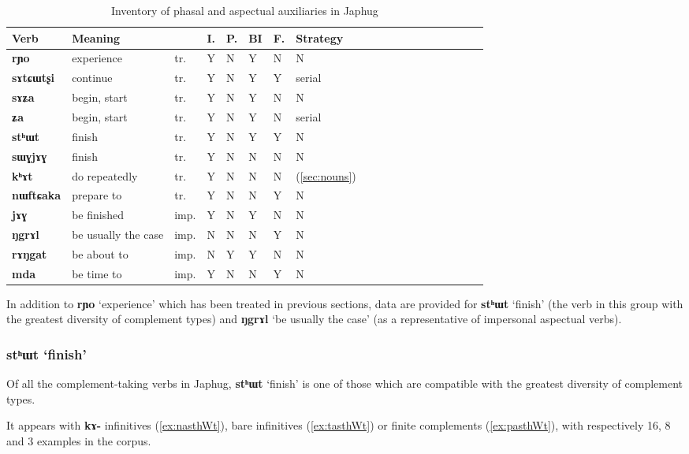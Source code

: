 \documentclass[oneside,a4paper,11pt]{article}
\newcommand{\ipa}[1]{\textbf{\phon#1}} %
\newcommand{\jpg}[2]{\ipa{#1} `#2'} %
\newcommand{\refb}[1]{(\ref{#1})}
\begin{document}
\begin{table}[H]
\caption{Inventory of phasal and aspectual auxiliaries in Japhug} \label{tab:phasal} 
\begin{tabular}{lllllllllllllllllll}
\toprule
Verb & 	Meaning & 	 & 	I. & 	P.& 	BI & 	F. & 	Strategy & 	\\
\midrule
\ipa{rɲo} & 	experience & 	tr. & 	Y & 	N & 	Y & 	N & 	N & 	\\
\ipa{sɤtɕɯtʂi} & 	continue & 	tr. & 	Y & 	N & 	Y & 	Y & 	serial & 	\\
\ipa{sɤʑa} & 	begin, start & 	tr. & 	Y & 	N & 	Y & 	N & 	N & 	\\
\ipa{ʑa} & 	begin, start & 	tr. & 	Y & 	N & 	Y & 	N & 	serial & 	\\
\ipa{stʰɯt} & 	finish & 	tr. & 	Y & 	N & 	Y & 	Y & 	N & 	\\
\ipa{sɯɣjɤɣ} & 	finish & 	tr. & 	Y & 	N & 	N & 	N & 	N & 	\\
\ipa{kʰɤt} & 	do repeatedly & 	tr. & 	Y & 	N & 	N & 	N & 	\refb{sec:nouns}& 	\\
\ipa{nɯftɕaka} & prepare to & 	tr. & 	Y & 	N & 	N & 	Y & 	N & 	\\
\midrule
\ipa{jɤɣ} & 	be finished & 	imp. & 	Y & 	N & 	Y & 	N & 	N & 	\\
\ipa{ŋgrɤl} & 	be usually the case & 	imp. & 	N & 	N & 	N & 	Y & 	N & 	\\
\ipa{rɤŋgat} & 	be about to & 	imp. & 	N & 	Y & 	Y & 	N & 	N & 	\\
\ipa{mda} & 	be time to & 	imp. & 	Y & 	N & N & 	Y & 	N & 	\\
\bottomrule
\end{tabular}
\end{table}

In addition to \jpg{rɲo}{experience} which has been treated in previous sections, data are provided for \jpg{stʰɯt}{finish} (the verb in this group with the greatest diversity of complement types) and \jpg{ŋgrɤl}{be usually the case} (as a representative of impersonal aspectual verbs).

\subsubsection{\jpg{stʰɯt}{finish}}
Of all the complement-taking verbs in Japhug, \jpg{stʰɯt}{finish} is one of those which are compatible with the greatest diversity of complement types.

It appears with \ipa{kɤ-} infinitives (\ref{ex:nasthWt}), bare infinitives (\ref{ex:tasthWt}) or finite complements (\ref{ex:pasthWt}), with respectively 16, 8 and 3 examples in the corpus. 
\end{document}
